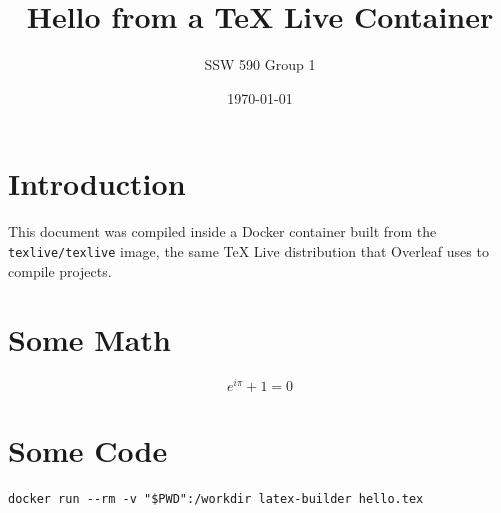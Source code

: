\documentclass{article}
\title{Hello from a TeX Live Container}
\author{SSW 590 Group 1}
\date{\today}
\begin{document}
\maketitle

\section{Introduction}
This document was compiled inside a Docker container built from the
\texttt{texlive/texlive} image, the same \TeX{} Live distribution that
Overleaf uses to compile projects.

\section{Some Math}
\begin{equation}
  e^{i\pi} + 1 = 0
\end{equation}

\section{Some Code}
\begin{verbatim}
docker run --rm -v "$PWD":/workdir latex-builder hello.tex
\end{verbatim}
\end{document}
